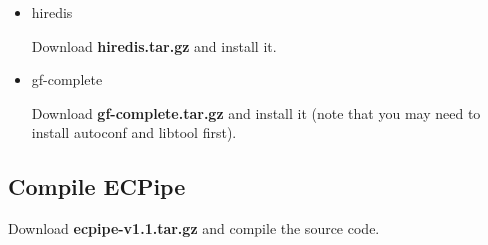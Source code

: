 \documentclass[letterpaper,12pt]{article}
\begin{document}
\begin{itemize}
\item hiredis

Download {\bf hiredis.tar.gz} and install it.

\begin{center}
\noindent{}
\end{center}

\item gf-complete

Download {\bf gf-complete.tar.gz} and install it (note that you may need to
install {\sf autoconf} and {\sf libtool} first).
%
\begin{center}
\noindent{}
\end{center}

\end{itemize}

\subsection{Compile ECPipe}

Download {\bf ecpipe-v1.1.tar.gz} and compile the source code.

\begin{center}
\noindent{}
\end{center}
\end{document}
